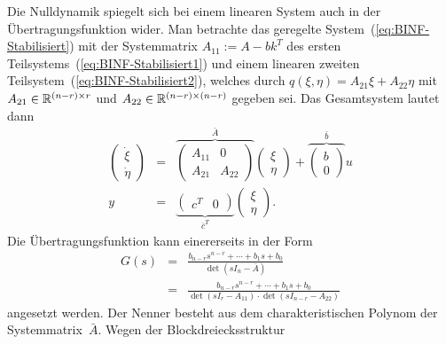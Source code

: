 \begin{remark}
\label{rem:Nulldynamik-Nullstellen-Uebertragungsfunktion}Die Nulldynamik
spiegelt sich bei einem linearen System auch in der Übertragungsfunktion
wider. Man betrachte das geregelte System~(\ref{eq:BINF-Stabilisiert})
mit der Systemmatrix $A_{11}:=A-bk^{T}$ des ersten Teilsystems~(\ref{eq:BINF-Stabilisiert1})
und einem linearen zweiten Teilsystem~(\ref{eq:BINF-Stabilisiert2}),
welches durch $q(\xi,\eta)=A_{21}\xi+A_{22}\eta$ mit $A_{21}\in{\mathbb{R}}^{(n-r)\times r}$
und $A_{22}\in{\mathbb{R}}^{(n-r)\times(n-r)}$ gegeben sei. Das Gesamtsystem
lautet dann 
\begin{equation}
\begin{array}{ccl}
\left(\begin{array}{c}
\dot{\xi}\\
\dot{\eta}
\end{array}\right) & = & \overbrace{\left(\begin{array}{cc}
A_{11} & 0\\
A_{21} & A_{22}
\end{array}\right)}^{{\displaystyle \bar{A}}}\left(\begin{array}{l}
\xi\\
\eta
\end{array}\right)+\overbrace{\left(\begin{array}{l}
b\\
0
\end{array}\right)}^{{\displaystyle \bar{b}}}u\\
y & = & \underbrace{\left(\begin{array}{cc}
c^{T} & 0\end{array}\right)}_{{\displaystyle \bar{c}^{T}}}\left(\begin{array}{l}
\xi\\
\eta
\end{array}\right).
\end{array}\label{eq:rel-grad-lineares-Gesamtsystem-ND}
\end{equation}
Die Übertragungsfunktion kann einererseits in der Form 
\begin{eqnarray}
G(s) & = & \frac{b_{n-r}s^{n-r}+\cdots+b_{1}s+b_{0}}{\det\left(sI_{n}-\bar{A}\right)}\nonumber \\
 & = & \frac{b_{n-r}s^{n-r}+\cdots+b_{1}s+b_{0}}{\det\left(sI_{r}-A_{11}\right)\cdot\det\left(sI_{n-r}-A_{22}\right)}\label{eq:rel-grad-UF1}
\end{eqnarray}
angesetzt werden. Der Nenner besteht aus dem charakteristischen Polynom
der Systemmatrix~$\bar{A}$. Wegen der Block\-dreiecks\-struktur

\end{remark}
